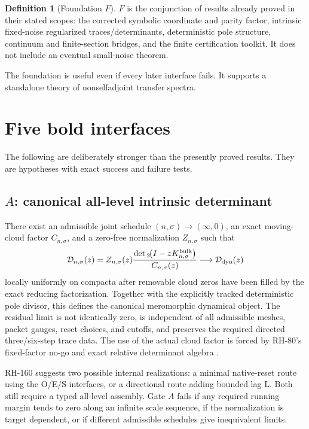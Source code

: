 \documentclass[11pt]{article}
\theoremstyle{definition}
\newtheorem{definition}[theorem]{Definition}
\theoremstyle{remark}
\newcommand{\cD}{\mathcal D}
\begin{document}
\begin{definition}[Foundation $F$]
$F$ is the conjunction of results already proved in their stated scopes:
the corrected symbolic coordinate and parity factor, intrinsic fixed-noise
regularized traces/determinants, deterministic pole structure, continuum and
finite-section bridges, and the finite certification toolkit.  It does not
include an eventual small-noise theorem.
\end{definition}

The foundation is useful even if every later interface fails.  It supports a
standalone theory of nonselfadjoint transfer spectra.

\section{Five bold interfaces}

The following are deliberately stronger than the presently proved results.
They are hypotheses with exact success and failure tests.

\subsection{\texorpdfstring{$A$}{A}: canonical all-level intrinsic determinant}

There exist an admissible joint schedule $(n,\sigma)\to(\infty,0)$, an exact
moving-cloud factor $C_{n,\sigma}$, and a zero-free normalization
$Z_{n,\sigma}$ such
that
\[
 \cD_{n,\sigma}(z)
 =Z_{n,\sigma}(z)
   \frac{\det{}_2\!\bigl(I-zK_{n,\sigma}^{\rm bulk}\bigr)}
        {C_{n,\sigma}(z)}
 \longrightarrow \cD_{\rm dyn}(z)
\]
locally uniformly on compacta after removable cloud zeros have been filled
by the exact reducing factorization.  Together with the explicitly tracked
deterministic pole divisor, this defines the canonical meromorphic dynamical
object.  The residual limit is not identically zero, is independent of all
admissible meshes, packet gauges, reset choices, and cutoffs, and preserves
the required directed three/six-step trace data.  The use of the actual cloud
factor is forced by RH-80's fixed-factor no-go and exact relative determinant
algebra \citep{WangRH80}.

RH-160 suggests two possible internal realizations: a minimal native-reset
route using the O/E/S interfaces, or a directional route adding bounded lag
L.  Both still require a typed all-level assembly.  Gate $A$ fails if any
required running margin tends to zero along an infinite scale sequence, if
the normalization is target dependent, or if different admissible schedules
give inequivalent limits.
\end{document}
